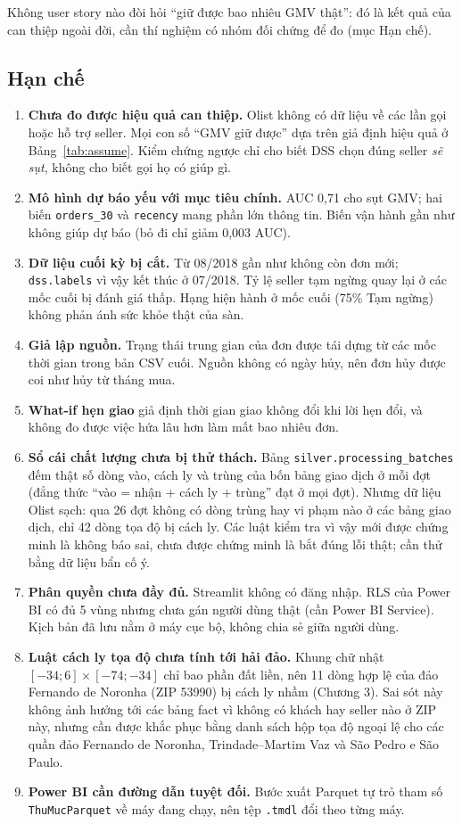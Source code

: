 Không user story nào đòi hỏi ``giữ được bao nhiêu GMV thật'': đó là kết quả của can thiệp ngoài đời, cần thí nghiệm có nhóm đối chứng để đo (mục Hạn chế).

\subsection{Hạn chế}
\begin{enumerate}
    \item \textbf{Chưa đo được hiệu quả can thiệp.} Olist không có dữ liệu về các lần gọi hoặc hỗ trợ seller. Mọi con số ``GMV giữ được'' dựa trên giả định hiệu quả ở Bảng~\ref{tab:assume}. Kiểm chứng ngược chỉ cho biết DSS chọn đúng seller \emph{sẽ sụt}, không cho biết gọi họ có giúp gì.
    \item \textbf{Mô hình dự báo yếu với mục tiêu chính.} AUC 0,71 cho sụt GMV; hai biến \texttt{orders\_30} và \texttt{recency} mang phần lớn thông tin. Biến vận hành gần như không giúp dự báo (bỏ đi chỉ giảm 0,003 AUC).
    \item \textbf{Dữ liệu cuối kỳ bị cắt.} Từ 08/2018 gần như không còn đơn mới; \texttt{dss.labels} vì vậy kết thúc ở 07/2018. Tỷ lệ seller tạm ngừng quay lại ở các mốc cuối bị đánh giá thấp. Hạng hiện hành ở mốc cuối (75\% Tạm ngừng) không phản ánh sức khỏe thật của sàn.
    \item \textbf{Giả lập nguồn.} Trạng thái trung gian của đơn được tái dựng từ các mốc thời gian trong bản CSV cuối. Nguồn không có ngày hủy, nên đơn hủy được coi như hủy từ tháng mua.
    \item \textbf{What-if hẹn giao} giả định thời gian giao không đổi khi lời hẹn đổi, và không đo được việc hứa lâu hơn làm mất bao nhiêu đơn.
    \item \textbf{Sổ cái chất lượng chưa bị thử thách.} Bảng \texttt{silver.}\allowbreak\texttt{processing\_batches} đếm thật số dòng vào, cách ly và trùng của bốn bảng giao dịch ở mỗi đợt (đẳng thức ``vào = nhận + cách ly + trùng'' đạt ở mọi đợt). Nhưng dữ liệu Olist sạch: qua 26 đợt không có dòng trùng hay vi phạm nào ở các bảng giao dịch, chỉ 42 dòng tọa độ bị cách ly. Các luật kiểm tra vì vậy mới được chứng minh là không báo sai, chưa được chứng minh là bắt đúng lỗi thật; cần thử bằng dữ liệu bẩn cố ý.
    \item \textbf{Phân quyền chưa đầy đủ.} Streamlit không có đăng nhập. RLS của Power BI có đủ 5 vùng nhưng chưa gán người dùng thật (cần Power BI Service). Kịch bản đã lưu nằm ở máy cục bộ, không chia sẻ giữa người dùng.
    \item \textbf{Luật cách ly tọa độ chưa tính tới hải đảo.} Khung chữ nhật $[-34; 6] \times [-74; -34]$ chỉ bao phần đất liền, nên 11 dòng hợp lệ của đảo Fernando de Noronha (ZIP 53990) bị cách ly nhầm (Chương 3). Sai sót này không ảnh hưởng tới các bảng fact vì không có khách hay seller nào ở ZIP này, nhưng cần được khắc phục bằng danh sách hộp tọa độ ngoại lệ cho các quần đảo Fernando de Noronha, Trindade--Martim Vaz và São Pedro e São Paulo.
    \item \textbf{Power BI cần đường dẫn tuyệt đối.} Bước xuất Parquet tự trỏ tham số \texttt{ThuMucParquet} về máy đang chạy, nên tệp \texttt{.tmdl} đổi theo từng máy.
\end{enumerate}

